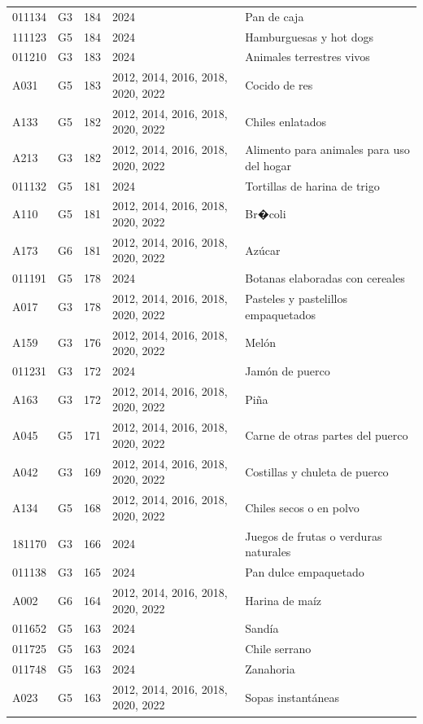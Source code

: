 \begin{table}[ht]
\begin{tabular}{llrll}
  011134 & G3 & 184 & 2024 & Pan de caja \\ 
  111123 & G5 & 184 & 2024 & Hamburguesas y hot dogs \\ 
  011210 & G3 & 183 & 2024 & Animales terrestres vivos \\ 
  A031 & G5 & 183 & 2012, 2014, 2016, 2018, 2020, 2022 & Cocido de res \\ 
  A133 & G5 & 182 & 2012, 2014, 2016, 2018, 2020, 2022 & Chiles enlatados \\ 
  A213 & G3 & 182 & 2012, 2014, 2016, 2018, 2020, 2022 & Alimento para animales para uso del hogar \\ 
  011132 & G5 & 181 & 2024 & Tortillas de harina de trigo \\ 
  A110 & G5 & 181 & 2012, 2014, 2016, 2018, 2020, 2022 & Br�coli \\ 
  A173 & G6 & 181 & 2012, 2014, 2016, 2018, 2020, 2022 & Azúcar \\ 
  011191 & G5 & 178 & 2024 & Botanas elaboradas con cereales \\ 
  A017 & G3 & 178 & 2012, 2014, 2016, 2018, 2020, 2022 & Pasteles y pastelillos empaquetados \\ 
  A159 & G3 & 176 & 2012, 2014, 2016, 2018, 2020, 2022 & Melón \\ 
  011231 & G3 & 172 & 2024 & Jamón de puerco \\ 
  A163 & G3 & 172 & 2012, 2014, 2016, 2018, 2020, 2022 & Piña \\ 
  A045 & G5 & 171 & 2012, 2014, 2016, 2018, 2020, 2022 & Carne de otras partes del puerco \\ 
  A042 & G3 & 169 & 2012, 2014, 2016, 2018, 2020, 2022 & Costillas y chuleta de puerco \\ 
  A134 & G5 & 168 & 2012, 2014, 2016, 2018, 2020, 2022 & Chiles secos o en polvo \\ 
  181170 & G3 & 166 & 2024 & Juegos de frutas o verduras naturales \\ 
  011138 & G3 & 165 & 2024 & Pan dulce empaquetado \\ 
  A002 & G6 & 164 & 2012, 2014, 2016, 2018, 2020, 2022 & Harina de maíz \\ 
  011652 & G5 & 163 & 2024 & Sandía \\ 
  011725 & G5 & 163 & 2024 & Chile serrano \\ 
  011748 & G5 & 163 & 2024 & Zanahoria \\ 
  A023 & G5 & 163 & 2012, 2014, 2016, 2018, 2020, 2022 & Sopas instantáneas \\ 

\end{tabular}
\end{table}
